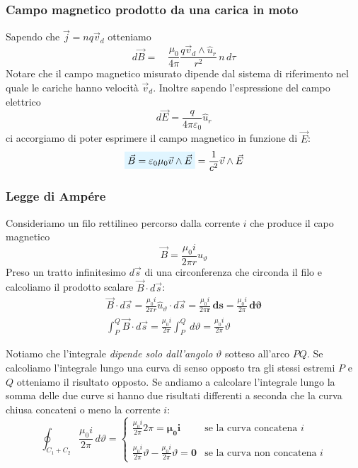 \documentclass[x11names]{report}
\begin{document}
\subsubsection{Campo magnetico prodotto da una carica in moto}
Sapendo che \(\vec{j} = n q \vec{v}_d\) otteniamo
\[
d\vec{B} = \quad \frac{\mu_0}{4\pi} \frac{q\vec{v}_d \wedge \hat{u}_r}{r^2} \, n \, d\tau 
\]
Notare che il campo magnetico misurato dipende dal sistema di riferimento nel quale le cariche hanno velocità \(\vec{v}_d\). Inoltre sapendo l'espressione del campo elettrico
\[
d\vec{E} = \frac{q}{4\pi \varepsilon_0}\hat{u}_r
\]
ci accorgiamo di poter esprimere il campo magnetico in funzione di \(\vec{E}\):
\begin{equation}
	\viola{\vec{B} = \varepsilon_0 \mu_0 \vec{v}\wedge\vec{E}} = \frac{1}{c^2} \vec{v}\wedge\vec{E}
\end{equation}

\subsubsection{Legge di Ampére}

Consideriamo un filo rettilineo percorso dalla corrente \(i\) che produce  il capo magnetico 
\[
\vec{B} = \frac{\mu_0 i}{2\pi r} \hat{u}_\vartheta
\]
Preso un tratto infinitesimo \(d\vec{s}\) di una circonferenza che circonda il filo e calcoliamo il prodotto scalare \(\vec{B}\cdot d\vec{s}\):
\begin{gather*}
	\vec{B}\cdot d\vec{s} = \frac{\mu_0 i}{2\pi r} \hat{u}_\vartheta \cdot d\vec{s} = \frac{\mu_0 i}{2\pi\boldsymbol{ r}} \, \boldsymbol{ds} = \frac{\mu_0 i}{2\pi} \, \boldsymbol{d\vartheta} \\
	\int_P^Q \vec{B}\cdot d\vec{s} =  \frac{\mu_0 i}{2\pi} \int_P^Q \, d\vartheta =  \frac{\mu_0 i}{2\pi} \vartheta
\end{gather*}
\begin{figure}[H]
	\centering
\end{figure}
Notiamo che l'integrale \textit{dipende solo dall'angolo} \(\vartheta\) sotteso all'arco \(PQ\). Se calcoliamo l'integrale lungo una curva di senso opposto tra gli stessi estremi \(P\) e \(Q\) otteniamo il risultato opposto. Se andiamo a calcolare l'integrale lungo la somma delle due curve si hanno due risultati differenti a seconda che la curva chiusa concateni o meno la corrente \(i\):
\[
\oint_{C_1 + C_2} \frac{\mu_0 i}{2\pi} \, d\vartheta = 
\left\{\begin{array}{lr}
	\frac{\mu_0 i}{2\pi}2\pi =\boldsymbol{ \mu_0 i} & \text{se la curva concatena } i\\ \\
	\frac{\mu_0 i}{2\pi}\vartheta - \frac{\mu_0 i}{2\pi}\vartheta = \boldsymbol{0} & \text{se la curva non concatena } i
\end{array}\right.
\]
\end{document}
